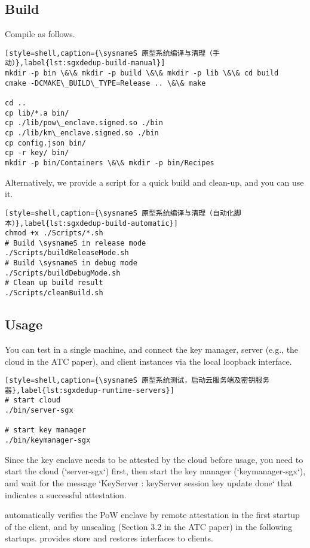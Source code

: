 \subsection{Build}

Compile \sysnameS as follows.

\begin{lstlisting}[style=shell,caption={\sysnameS 原型系统编译与清理（手动）},label{lst:sgxdedup-build-manual}]
mkdir -p bin \&\& mkdir -p build \&\& mkdir -p lib \&\& cd build
cmake -DCMAKE\_BUILD\_TYPE=Release .. \&\& make

cd ..
cp lib/*.a bin/
cp ./lib/pow\_enclave.signed.so ./bin
cp ./lib/km\_enclave.signed.so ./bin
cp config.json bin/
cp -r key/ bin/
mkdir -p bin/Containers \&\& mkdir -p bin/Recipes
\end{lstlisting}

Alternatively, we provide a script for a quick build and clean-up, and you can use it.

\begin{lstlisting}[style=shell,caption={\sysnameS 原型系统编译与清理（自动化脚本）},label{lst:sgxdedup-build-automatic}]
chmod +x ./Scripts/*.sh
# Build \sysnameS in release mode
./Scripts/buildReleaseMode.sh
# Build \sysnameS in debug mode
./Scripts/buildDebugMode.sh
# Clean up build result
./Scripts/cleanBuild.sh
\end{lstlisting}

\subsection{Usage}

You can test \sysnameS in a single machine, and connect the key manager, server (e.g., the cloud in the ATC paper), and client instances via the local loopback interface.

\begin{lstlisting}[style=shell,caption={\sysnameS 原型系统测试，启动云服务端及密钥服务器},label{lst:sgxdedup-runtime-servers}]
# start cloud
./bin/server-sgx

# start key manager
./bin/keymanager-sgx
\end{lstlisting}

Since the key enclave  needs to be attested by the cloud before usage, you need to start the cloud (`server-sgx`) first, then start the key manager (`keymanager-sgx`), and wait for the message `KeyServer : keyServer session key update done` that indicates a successful attestation.

\sysnameS automatically verifies the PoW enclave by remote attestation in the first startup of the client, and by unsealing (Section 3.2 in the ATC paper) in the following startups. \sysnameS provides store and restores interfaces to clients.

